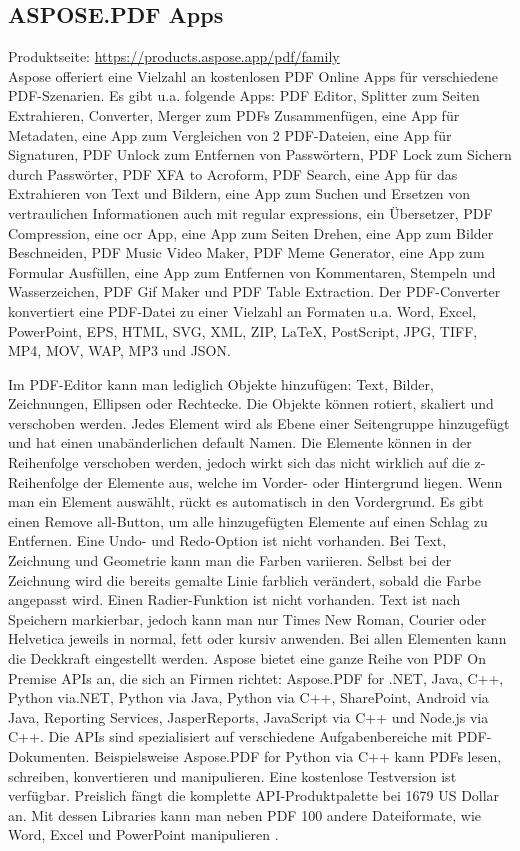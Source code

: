 \subsection{ASPOSE.PDF Apps}
Produktseite: \url{https://products.aspose.app/pdf/family} \\
Aspose offeriert eine Vielzahl an kostenlosen PDF Online Apps für verschiedene PDF-Szenarien. Es gibt u.a. folgende Apps: PDF Editor, Splitter zum Seiten Extrahieren, Converter, Merger zum PDFs Zusammenfügen, eine App für Metadaten, eine App zum Vergleichen von 2 PDF-Dateien, eine App für Signaturen, PDF Unlock zum Entfernen von Passwörtern, PDF Lock zum Sichern durch Passwörter, PDF XFA to Acroform, PDF Search, eine App für das Extrahieren von Text und Bildern, eine App zum Suchen und Ersetzen von vertraulichen Informationen auch mit regular expressions, ein Übersetzer, PDF Compression, eine \gls{ocr} App, eine App zum Seiten Drehen, eine App zum Bilder Beschneiden, PDF Music Video Maker, PDF Meme Generator, eine App zum Formular Ausfüllen, eine App zum Entfernen von Kommentaren, Stempeln und Wasserzeichen, PDF Gif Maker und PDF Table Extraction. Der PDF-Converter konvertiert eine PDF-Datei zu einer Vielzahl an Formaten u.a. Word, Excel, PowerPoint, EPS, HTML, SVG, XML, ZIP, LaTeX, PostScript, JPG, TIFF, MP4, MOV, WAP, MP3 und JSON. 
\par
Im PDF-Editor kann man lediglich Objekte hinzufügen: Text, Bilder, Zeichnungen, Ellipsen oder Rechtecke. Die Objekte können rotiert, skaliert und verschoben werden. Jedes Element wird als Ebene einer Seitengruppe hinzugefügt und hat einen unabänderlichen default Namen. Die Elemente können in der Reihenfolge verschoben werden, jedoch wirkt sich das nicht wirklich auf die z-Reihenfolge der Elemente aus, welche im Vorder- oder Hintergrund liegen. Wenn man ein Element auswählt, rückt es automatisch in den Vordergrund. Es gibt einen Remove all-Button, um alle hinzugefügten Elemente auf einen Schlag zu Entfernen. Eine Undo- und Redo-Option ist nicht vorhanden. Bei Text, Zeichnung und Geometrie kann man die Farben variieren. Selbst bei der Zeichnung wird die bereits gemalte Linie farblich verändert, sobald die Farbe angepasst wird. Einen Radier-Funktion ist nicht vorhanden. Text ist nach Speichern markierbar, jedoch kann man nur Times New Roman, Courier oder Helvetica jeweils in normal, fett oder kursiv anwenden. Bei allen Elementen kann die Deckkraft eingestellt werden. Aspose bietet eine ganze Reihe von PDF On Premise APIs an, die sich an Firmen richtet: Aspose.PDF for .NET, Java, C++, Python via.NET, Python via Java, Python via C++, SharePoint, Android via Java, Reporting Services, JasperReports, JavaScript via C++ und Node.js via C++. Die APIs sind spezialisiert auf verschiedene Aufgabenbereiche mit PDF-Dokumenten. Beispielsweise Aspose.PDF for Python via C++ kann PDFs lesen, schreiben, konvertieren und manipulieren. Eine kostenlose Testversion ist verfügbar. Preislich fängt die komplette API-Produktpalette bei 1679 US Dollar an. Mit dessen Libraries kann man neben PDF 100 andere Dateiformate, wie Word, Excel und PowerPoint manipulieren \cite{aspose-api}.

